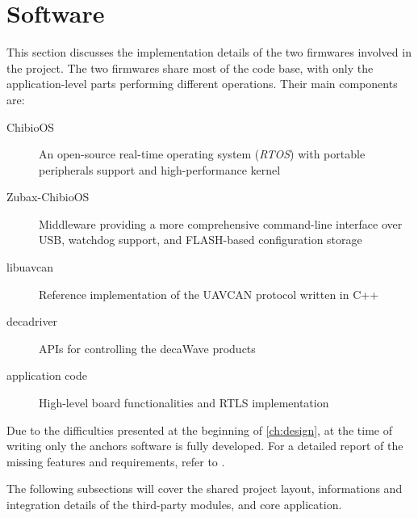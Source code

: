 \section{Software}\label{sec:software}

This section discusses the implementation details of the two firmwares involved in the project.
The two firmwares share most of the code base, with only the application-level parts performing different operations.
Their main components are:
\begin{description}
    \item[ChibioOS] An open-source real-time operating system (\emph{RTOS}) with portable peripherals support and high-performance kernel
    \item[Zubax-ChibioOS] Middleware providing a more comprehensive command-line interface over USB, watchdog support, and FLASH-based configuration storage
    \item[libuavcan] Reference implementation of the UAVCAN protocol written in C++
    \item[decadriver] APIs for controlling the decaWave products
    \item[application code] High-level board functionalities and RTLS implementation
\end{description}

Due to the difficulties presented at the beginning of \autoref{ch:design}, at the time of writing only the anchors software is fully developed.
For a detailed report of the missing features and requirements, refer to .

The following subsections will cover the shared project layout, informations and integration details of the third-party modules, and core application.











